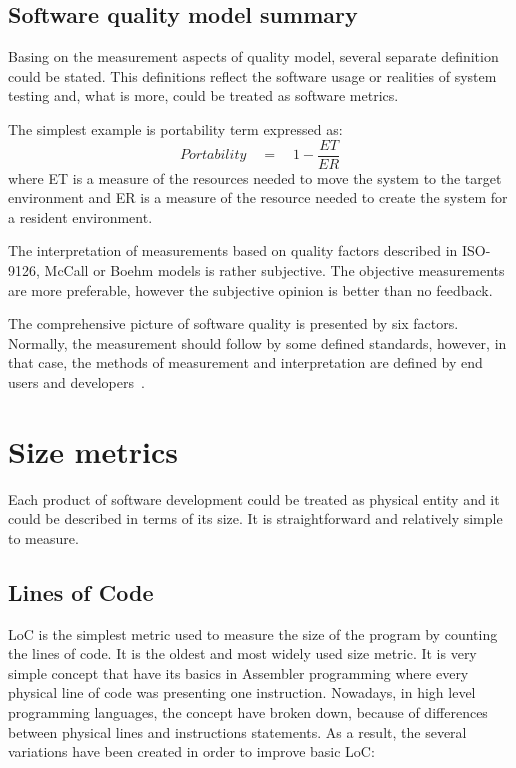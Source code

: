\subsection{Software quality model summary}
Basing on the measurement aspects of quality model, several separate definition could be stated. This definitions reflect the software usage or realities of system testing and, what is more, could be treated as software metrics. 

The simplest example is portability term expressed as:
\begin{equation}
Portability\quad =\quad 1-\frac { ET }{ ER } 
\end{equation} 
where ET is a measure of the resources needed to move the system to the target environment and ER is a measure of the resource needed to create the system for a resident environment. 

The interpretation of measurements based on quality factors described in ISO-9126, McCall or Boehm models is rather subjective. The objective measurements are more preferable, however the subjective opinion is better than no feedback.  

The comprehensive picture of software quality is presented by six factors. Normally, the measurement should follow  by some defined standards, however, in that case, the methods of measurement and interpretation are defined by end users and developers~\cite{rigorous}.

\section{Size metrics}

Each product of software development could be treated as physical entity and it could be described in terms of its size. It is straightforward and relatively simple to measure. 

\subsection{Lines of Code}
\ac{LoC} is the simplest metric used to measure the size of the program by counting the lines of code. It is the oldest and most widely used size metric. It is very simple concept that have its basics in Assembler programming where every physical line of code was presenting  one instruction. Nowadays, in high level programming languages, the concept have broken down, because of differences between physical lines and instructions statements. As a result, the several variations have been created in order to improve basic \ac{LoC}:

